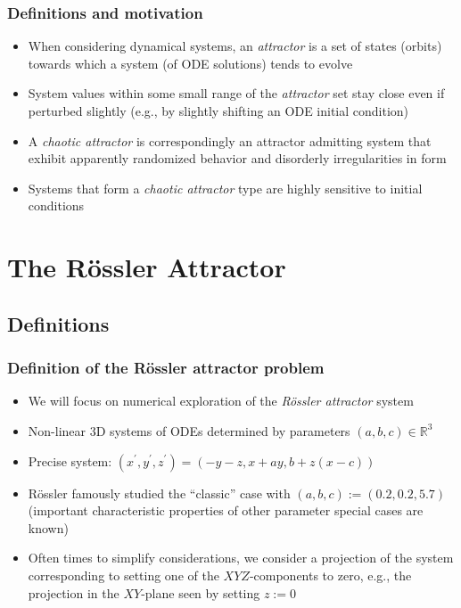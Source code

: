 \documentclass[usenames,svgnames,dvipsnames,10pt]{beamer}
\begin{document}
\begin{frame}
\frametitle{Definitions and motivation}

\begin{itemize} 
 
\item When considering dynamical systems, an \emph{attractor} is a set of states (orbits) towards which a system (of ODE solutions) 
      tends to evolve
\item System values within some small range of the \emph{attractor} set stay close even if perturbed slightly 
      (e.g., by slightly shifting an ODE initial condition) 
\item A \emph{chaotic attractor} is correspondingly an attractor admitting system that exhibit apparently randomized behavior and 
      disorderly irregularities in form 
\item Systems that form a \emph{chaotic attractor} type are highly sensitive to initial conditions 

\end{itemize} 

\end{frame}

\section{The R\"ossler Attractor} 

\subsection{Definitions} 

\begin{frame}
\frametitle{Definition of the R\"ossler attractor problem}

\begin{itemize} 

\item We will focus on numerical exploration of the \emph{R\"ossler attractor} system 
\item Non-linear 3D systems of ODEs determined by parameters $(a, b, c) \in \mathbb{R}^3$ 
\item Precise system: $(x^{\prime}, y^{\prime}, z^{\prime}) = (-y-z, x+ay, b + z(x-c))$ 
\item R\"ossler famously studied the ``classic'' case with $(a, b, c) := (0.2, 0.2, 5.7)$ 
      (important characteristic properties of other parameter special cases are known) 
\item Often times to simplify considerations, we consider a projection of the system corresponding to 
      setting one of the $XYZ$-components to zero, e.g., the projection in the $XY$-plane seen by setting 
      $z := 0$ 

\end{itemize} 

\end{frame}
\end{document}
